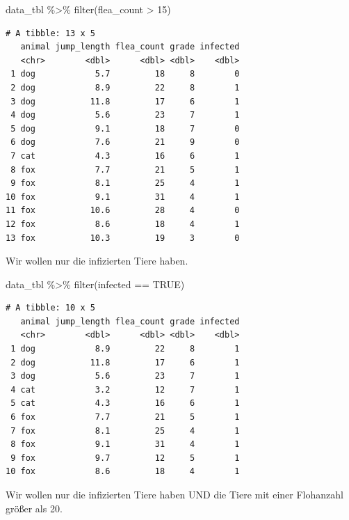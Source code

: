 \documentclass[
  letterpaper,
]{scrbook}
\newenvironment{Shaded}{\begin{snugshade}}{\end{snugshade}}
\newcommand{\ConstantTok}[1]{\textcolor[rgb]{0.56,0.35,0.01}{#1}}
\newcommand{\DecValTok}[1]{\textcolor[rgb]{0.68,0.00,0.00}{#1}}
\newcommand{\FunctionTok}[1]{\textcolor[rgb]{0.28,0.35,0.67}{#1}}
\newcommand{\NormalTok}[1]{\textcolor[rgb]{0.00,0.23,0.31}{#1}}
\newcommand{\SpecialCharTok}[1]{\textcolor[rgb]{0.37,0.37,0.37}{#1}}
\begin{document}
\begin{Shaded}
\begin{Highlighting}[]
\NormalTok{data\_tbl }\SpecialCharTok{\%\textgreater{}\%} 
  \FunctionTok{filter}\NormalTok{(flea\_count }\SpecialCharTok{\textgreater{}} \DecValTok{15}\NormalTok{)}
\end{Highlighting}
\end{Shaded}

\begin{verbatim}
# A tibble: 13 x 5
   animal jump_length flea_count grade infected
   <chr>        <dbl>      <dbl> <dbl>    <dbl>
 1 dog            5.7         18     8        0
 2 dog            8.9         22     8        1
 3 dog           11.8         17     6        1
 4 dog            5.6         23     7        1
 5 dog            9.1         18     7        0
 6 dog            7.6         21     9        0
 7 cat            4.3         16     6        1
 8 fox            7.7         21     5        1
 9 fox            8.1         25     4        1
10 fox            9.1         31     4        1
11 fox           10.6         28     4        0
12 fox            8.6         18     4        1
13 fox           10.3         19     3        0
\end{verbatim}

Wir wollen nur die infizierten Tiere haben.

\begin{Shaded}
\begin{Highlighting}[]
\NormalTok{data\_tbl }\SpecialCharTok{\%\textgreater{}\%} 
  \FunctionTok{filter}\NormalTok{(infected }\SpecialCharTok{==} \ConstantTok{TRUE}\NormalTok{)}
\end{Highlighting}
\end{Shaded}

\begin{verbatim}
# A tibble: 10 x 5
   animal jump_length flea_count grade infected
   <chr>        <dbl>      <dbl> <dbl>    <dbl>
 1 dog            8.9         22     8        1
 2 dog           11.8         17     6        1
 3 dog            5.6         23     7        1
 4 cat            3.2         12     7        1
 5 cat            4.3         16     6        1
 6 fox            7.7         21     5        1
 7 fox            8.1         25     4        1
 8 fox            9.1         31     4        1
 9 fox            9.7         12     5        1
10 fox            8.6         18     4        1
\end{verbatim}

Wir wollen nur die infizierten Tiere haben UND die Tiere mit einer
Flohanzahl größer als 20.
\end{document}
